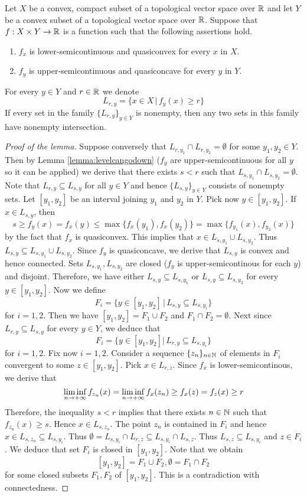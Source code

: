 \begin{lemma}\label{lemma:pairintersectionsionslemma}
Let $X$ be a convex, compact subset of a topological vector space over ${\mathbb R}$ and let $Y$ be a convex subset of a topological vector space over ${\mathbb R}$. Suppose that $f:X\times Y\rightarrow {\mathbb R}$ is a function such that the following assertions hold.
\begin{enumerate}[label=\emph{\textbf{(\arabic*)}}, leftmargin=1.5em]
\item $f_x$ is lower-semicontinuous and quasiconvex for every $x$ in $X$.
\item $f_y$ is upper-semicontinuous and quasiconcave for every $y$ in $Y$.
\end{enumerate}
For every $y\in Y$ and $r \in {\mathbb R}$ we denote
$$L_{r,y} = \big\{x\in X\,\big|\,f_y(x)\geq r \big\}$$
If every set in the family $\{L_{r,y}\}_{y\in Y}$ is nonempty, then any two sets in this family have nonempty intersection. 
\end{lemma}
\begin{proof}[Proof of the lemma]
Suppose conversely that $L_{r,y_1}\cap L_{r,y_2} = \emptyset$ for some $y_1,y_2\in Y$. Then by Lemma \ref{lemma:levelcangodown} ($f_y$ are upper-semicontinuous for all $y$ so it can be applied) we derive that there exists $s < r$ such that $L_{s,y_1}\cap L_{s,y_2}= \emptyset$. Note that $L_{r,y}\subseteq L_{s,y}$ for all $y\in Y$ and hence $\{L_{s,y}\}_{y\in Y}$ consists of nonempty sets. Let $[y_1,y_2]$ be an interval joining $y_1$ and $y_2$ in $Y$. Pick now $y\in [y_1,y_2]$. If $x\in L_{s,y}$, then
$$s\geq f_y(x) = f_x(y) \leq \max\{f_{x}(y_1),f_{x}(y_2)\} = \max\{f_{y_1}(x), f_{y_2}(x)\}$$
by the fact that $f_x$ is quasiconvex. This implies that $x\in L_{s,y_1}\cup L_{s,y_2}$. Thus $L_{s,y}\subseteq L_{s,y_1}\cup L_{s,y_2}$. Since $f_y$ is quasiconcave, we derive that $L_{s,y}$ is convex and hence connected. Sets $L_{s,y_1},L_{s,y_2}$ are closed ($f_y$ is upper-semicontinous for each $y$) and disjoint. Therefore, we have either $L_{s,y}\subseteq L_{s,y_1}$ or $L_{s,y}\subseteq L_{s,y_2}$ for every $y\in [y_1,y_2]$. Now we define
$$F_i = \big\{y\in [y_1,y_2]\,\big|\,L_{s,y}\subseteq L_{s,y_i}\big\}$$
for $i=1, 2$. Then we have $[y_1,y_2] = F_1\cup F_2$ and $F_1\cap F_2 = \emptyset$. Next since $L_{r,y}\subseteq L_{s,y}$ for every $y\in Y$, we deduce that
$$F_i = \big\{y\in [y_1,y_2]\big|\,L_{r,y}\subseteq L_{s,y_i}\big\}$$
for $i = 1, 2$. Fix now $i = 1, 2$. Consider a sequence $\{z_n\}_{n\in {\mathbb N}}$ of elements in $F_i$ convergent to some $z\in [y_1,y_2]$. Pick $x\in L_{r,z}$. Since $f_x$ is lower-semicontinous, we derive that
$$\liminf_{n\rightarrow +\infty}f_{z_n}(x)=\liminf_{n\rightarrow +\infty}f_x(z_n) \geq f_x(z) = f_z(x) \geq r$$
Therefore, the inequality $s< r$ implies that there exists $n\in {\mathbb N}$ such that $f_{z_n}(x)\geq s$. Hence $x\in L_{s,z_n}$. The point $z_n$ is contained in $F_i$ and hence $x\in L_{s,z_n}\subseteq L_{s,y_i}$. Thus $\emptyset = L_{s,y_i}\cap L_{r,z}\subseteq L_{s,y_i}\cap L_{s,z}$. Thus $L_{s,z}\subseteq L_{s,y_i}$ and $z\in F_i$. We deduce that set $F_i$ is closed in $[y_1,y_2]$. Note that we obtain
$$[y_1,y_2] = F_1\cup F_2,\emptyset = F_1\cap F_2$$
for some closed subsets $F_1,F_2$ of $[y_1,y_2]$. This is a contradiction with connectedness.
\end{proof}
